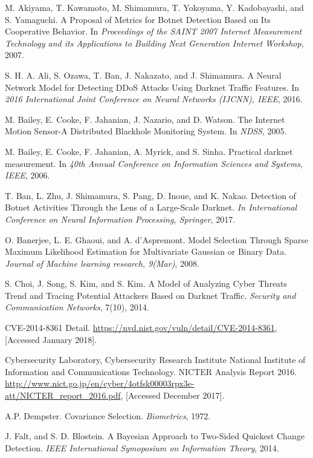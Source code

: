 \documentclass{sig-alternate-10pt}
\begin{document}
\begin{thebibliography}{25}

M. Akiyama, T. Kawamoto, M. Shimamura, T. Yokoyama, Y. Kadobayashi, and S. Yamaguchi. A Proposal of Metrics for Botnet Detection Based on Its Cooperative Behavior. In {\it Proceedings of the SAINT 2007 Internet Measurement Technology and its Applications to Building Next Generation Internet Workshop}, 2007.

S. H. A. Ali, S. Ozawa, T. Ban, J. Nakazato, and J. Shimamura. A Neural Network Model for Detecting DDoS Attacks Using Darknet Traffic Features. In {\it 2016 International Joint Conference on Neural Networks (IJCNN), IEEE}, 2016.

M. Bailey, E. Cooke, F. Jahanian, J. Nazario, and D. Watson. The Internet Motion Sensor-A Distributed Blackhole Monitoring System. In {\it NDSS}, 2005.

M. Bailey, E. Cooke, F. Jahanian, A. Myrick, and S. Sinha. Practical darknet measurement. In {\it 40th Annual Conference on Information Sciences and Systems, IEEE}, 2006.

T. Ban, L. Zhu, J. Shimamura, S. Pang, D. Inoue, and K. Nakao. Detection of Botnet Activities Through the Lens of a Large-Scale Darknet. {\it In International Conference on Neural Information Processing, Springer}, 2017.

O. Banerjee, L. E. Ghaoui, and A. d’Aspremont. Model Selection Through Sparse Maximum Likelihood Estimation for Multivariate Gaussian or Binary Data. {\it Journal of Machine learning research, 9(Mar)}, 2008.

S. Choi, J. Song, S. Kim, and S. Kim. A Model of Analyzing Cyber Threats Trend and Tracing Potential Attackers Based on Darknet Traffic. {\it Security and Communication Networks}, 7(10), 2014.

CVE-2014-8361 Detail. \url{https://nvd.nist.gov/vuln/detail/CVE-2014-8361}, [Accessed January 2018].

Cybersecurity Laboratory, Cybersecurity Research Institute
National Institute of Information and Communications Technology. NICTER Analysis Report 2016. \url{http://www.nict.go.jp/en/cyber/4otfsk00003rpx3e-att/NICTER_report_2016.pdf}, [Accessed December 2017].

A.P. Dempster. Covariance Selection. {\it Biometrics}, 1972.

J. Falt, and S. D. Blostein. A Bayesian Approach to Two-Sided Quickest Change Detection. {\it IEEE International Symoposium on Information Theory}, 2014.


\end{thebibliography}
\end{document}
